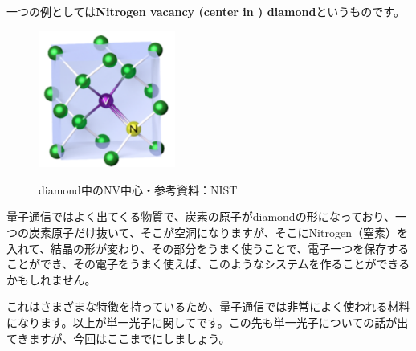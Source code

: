 一つの例としては\textbf{Nitrogen vacancy (center in ) diamond}というものです。
\begin{figure}[H]
    \centering
    \includegraphics[width=0.4\textwidth]{lesson5/NV_Diamond.pdf}
    \label{図: 1}
    \caption{diamond中のNV中心・参考資料：NIST}
\end{figure}
量子通信ではよく出てくる物質で、炭素の原子がdiamondの形になっており、一つの炭素原子だけ抜いて、そこが空洞になりますが、そこにNitrogen（窒素）を入れて、結晶の形が変わり、その部分をうまく使うことで、電子一つを保存することができ、その電子をうまく使えば、このようなシステムを作ることができるかもしれません。

これはさまざまな特徴を持っているため、量子通信では非常によく使われる材料になります。以上が単一光子に関してです。この先も単一光子についての話が出てきますが、今回はここまでにしましょう。


